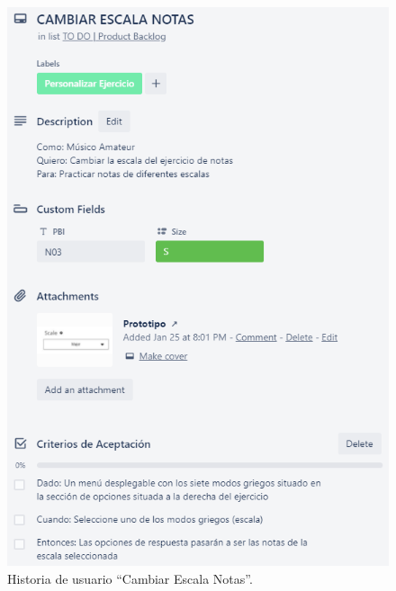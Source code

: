 \documentclass[12pt,twoside,titlepage]{report}
\begin{document}
\begin{figure}[H]
    \centering
    \includegraphics[scale=1.3]{Scrum/User Stories/NotasSelectorEscalas}
    \caption{Historia de usuario ``Cambiar Escala Notas''.}
    \label{fig:NotasSelectorEscalas}
\end{figure}
\end{document}
